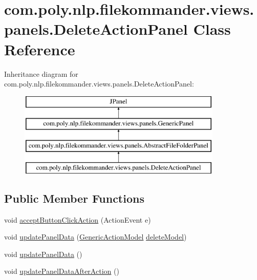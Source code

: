 \hypertarget{classcom_1_1poly_1_1nlp_1_1filekommander_1_1views_1_1panels_1_1_delete_action_panel}{\section{com.\-poly.\-nlp.\-filekommander.\-views.\-panels.\-Delete\-Action\-Panel Class Reference}
\label{classcom_1_1poly_1_1nlp_1_1filekommander_1_1views_1_1panels_1_1_delete_action_panel}
}
Inheritance diagram for com.\-poly.\-nlp.\-filekommander.\-views.\-panels.\-Delete\-Action\-Panel\-:\begin{figure}[H]
\begin{center}
\leavevmode
\includegraphics[height=4.000000cm]{classcom_1_1poly_1_1nlp_1_1filekommander_1_1views_1_1panels_1_1_delete_action_panel}
\end{center}
\end{figure}
\subsection*{Public Member Functions}
\begin{DoxyCompactItemize}
\item 
void \hyperlink{classcom_1_1poly_1_1nlp_1_1filekommander_1_1views_1_1panels_1_1_delete_action_panel_a2049f5ac86d15967fade2ceb251e724f}{accept\-Button\-Click\-Action} (Action\-Event e)
\item 
void \hyperlink{classcom_1_1poly_1_1nlp_1_1filekommander_1_1views_1_1panels_1_1_delete_action_panel_a98939dcae8c9ec0a27ab83ebfc6561bc}{update\-Panel\-Data} (\hyperlink{interfacecom_1_1poly_1_1nlp_1_1filekommander_1_1views_1_1models_1_1_generic_action_model}{Generic\-Action\-Model} \hyperlink{classcom_1_1poly_1_1nlp_1_1filekommander_1_1views_1_1panels_1_1_delete_action_panel_a17228ab26020f99bdef1f28e0d525d39}{delete\-Model})
\item 
void \hyperlink{classcom_1_1poly_1_1nlp_1_1filekommander_1_1views_1_1panels_1_1_delete_action_panel_a6c96ac06a49ae5e6878ea779ddebb722}{update\-Panel\-Data} ()
\item 
void \hyperlink{classcom_1_1poly_1_1nlp_1_1filekommander_1_1views_1_1panels_1_1_delete_action_panel_a8334eff673455509d9432646a4c49799}{update\-Panel\-Data\-After\-Action} ()
\end{DoxyCompactItemize}
